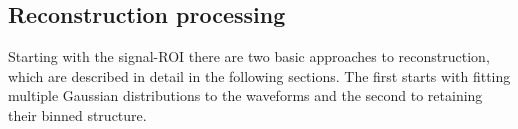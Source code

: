 \subsection{Reconstruction processing}
\label{sec:prod-process}

Starting with the signal-ROI there are two basic approaches to
reconstruction, which are described in detail in the following
sections.  The first starts with fitting multiple Gaussian
distributions to the waveforms and the second to retaining their
binned structure.


